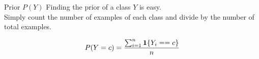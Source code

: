 \bgroup  
\begin{frame}{Prior $P(Y)$}
Finding the prior of a class $Y$ is easy.\\
Simply count the number of examples of each class and divide by the number of total examples.

\begin{equation*}
P(Y=c) = \frac{\sum_{i=1}^n \bold{1}\{Y_i == c\}}{n}
\end{equation*}
\end{frame}
\egroup